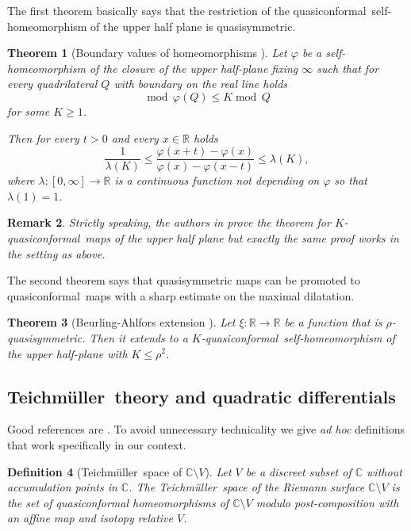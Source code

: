\documentclass[10pt,reqno,a4paper]{amsart}
\numberwithin{figure}{section}
\numberwithin{equation}{section}
\newtheorem{thm}{Theorem}[section]
\newtheorem{defn}[thm]{Definition}
\newtheorem{remark}[thm]{Remark}
\newcommand{\tei}{Teichm\"uller}
\newcommand{\qc}{quasiconformal}
\renewcommand{\mod}{\operatorname{mod\,}}
\begin{document}
The first theorem basically says that the restriction of the \qc\ self-homeomorphism of the upper half plane is quasisymmetric.

\begin{thm}[Boundary values of homeomorphisms {\cite[Theorem~6.2]{LehtoVirtanen}}]
	Let $\varphi$ be a self-homeomorphism of the closure of the upper half-plane fixing $\infty$ such that for every quadrilateral $Q$ with boundary on the real line holds 
	$$\mod\varphi(Q)\leq K\mod Q$$ for some $K\geq 1$.
	
	Then for every $t>0$ and every $x\in\mathbb{R}$ holds
	$$\frac{1}{\lambda(K)}\leq\frac{\varphi(x+t)-\varphi(x)}{\varphi(x)-\varphi(x-t)}\leq\lambda(K),$$
	where $\lambda:[0,\infty]\to\mathbb{R}$ is a continuous function not depending on $\varphi$ so that $\lambda(1)=1$. 
\end{thm}

\begin{remark}
	Strictly speaking, the authors in \cite{LehtoVirtanen} prove the theorem for $K$-\qc\ maps of the upper half plane but exactly the same proof works in the setting as above.
\end{remark}

The second theorem says that quasisymmetric maps can be promoted to \qc\ maps with a sharp estimate on the maximal dilatation.

\begin{thm}[Beurling-Ahlfors extension \cite{BA}]
	\label{thm:BA-extension}
	Let $\xi:\mathbb{R}\to\mathbb{R}$ be a function that is $\rho$-quasisymmetric. Then it extends to a $K$-\qc\ self-homeomorphism of the upper half-plane with $K\leq\rho^2$. 
\end{thm}

\subsection{\tei\ theory and quadratic differentials}

Good references are \cite{Gardiner,HubbardBook1}. To avoid unnecessary technicality we give \emph{ad hoc} definitions that work specifically in our context. 

\begin{defn}[\tei\ space of $\mathbb{C}\setminus V$]
	\label{defn:teich_space_main}
	Let $V$ be a discreet subset of $\mathbb{C}$ without accumulation points in $\mathbb{C}$. The \emph{\tei\ space} of the Riemann surface $\mathbb{C}\setminus V$ is the set of quasiconformal homeomorphisms of $\mathbb{C}\setminus V$ modulo post-composition with an affine map and isotopy relative $V$.
\end{defn}
\end{document}
